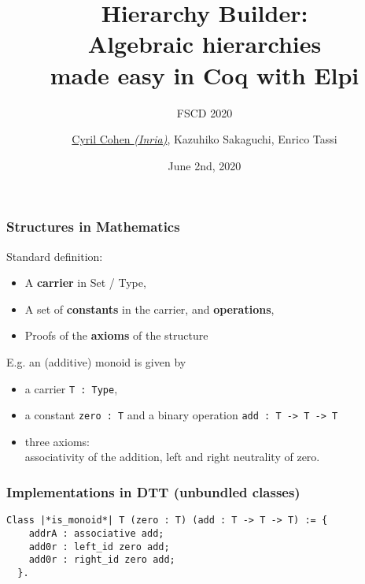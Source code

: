 \documentclass[11pt]{beamer}
\let\L=\lstinline
\begin{document}
\title[Hierarchy Builder]{{Hierarchy Builder:}\\ {Algebraic
    hierarchies} \\ {made easy} {in {\sc Coq} with {\sc Elpi}}}
\subtitle{FSCD 2020}

\author[\underline{Cohen}, Sakaguchi, Tassi]{
  \underline{Cyril Cohen \textit{(Inria)}}, Kazuhiko Sakaguchi, Enrico
Tassi}


\date{June 2nd, 2020}

\begin{frame}
\titlepage
\end{frame}

\begin{frame}[fragile]
  \frametitle{Structures in Mathematics}

  Standard definition:
  \begin{itemize}
  \item A \textbf{carrier} in Set / Type,
  \item A set of \textbf{constants} in the carrier, and \textbf{operations},
  \item Proofs of the \textbf{axioms} of the structure
  \end{itemize}

  \pause
  \vfill

  E.g. an (additive) monoid is given by
  \begin{itemize}
  \item a carrier \L{T : Type},
  \item a constant \L{zero : T} and a binary operation %
    \L{add : T -> T -> T}
  \item three axioms: \\
    associativity of the addition, left and right neutrality of zero.
  \end{itemize}

\end{frame}


\begin{frame}[fragile]
  \frametitle{Implementations in DTT (unbundled classes)}

\begin{lstlisting}
Class |*is_monoid*| T (zero : T) (add : T -> T -> T) := {
    addrA : associative add;
    add0r : left_id zero add;
    add0r : right_id zero add;
  }.
\end{lstlisting}

\end{frame}
\end{document}
